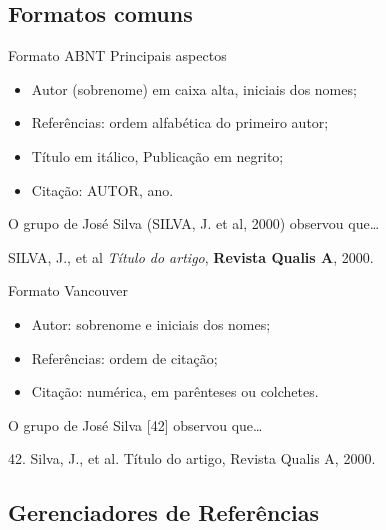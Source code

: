 \documentclass{beamer}
\begin{document}
\subsection{Formatos comuns}

\begin{frame}{Formato ABNT}
  Principais aspectos
  \begin{itemize}
  \item Autor (sobrenome) em caixa alta, iniciais dos nomes;
  \item Referências: ordem alfabética do primeiro autor;
  \item Título em itálico, Publicação em negrito;
  \item Citação: AUTOR, ano.
  \end{itemize}
  \begin{example}[Citação]
    O grupo de José Silva (SILVA, J. et al, 2000) observou que\ldots
  \end{example}
  \begin{example}[Referência]
    SILVA, J., et al {\em Título do artigo}, {\bf Revista Qualis A},
    2000.
  \end{example}
\end{frame}

\begin{frame}{Formato Vancouver}
  \begin{itemize}
  \item Autor: sobrenome e iniciais dos nomes;
  \item Referências: ordem de citação;
  \item Citação: numérica, em parênteses ou colchetes.
  \end{itemize}
  \begin{example}[Citação]
    O grupo de José Silva [42] observou que\ldots
  \end{example}
  \begin{example}[Referência]
    42. Silva, J., et al. Título do artigo, Revista Qualis A, 2000.
  \end{example}
\end{frame}
\subsection{Gerenciadores de Referências}
\end{document}
